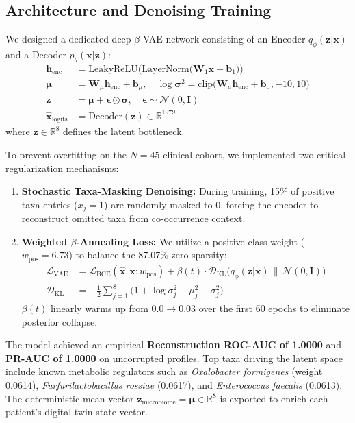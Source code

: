 \documentclass[conference]{IEEEtran}
\begin{document}
\subsection{Architecture and Denoising Training}
We designed a dedicated deep $\beta$-VAE network consisting of an Encoder $q_\phi(\mathbf{z}|\mathbf{x})$ and a Decoder $p_\theta(\mathbf{x}|\mathbf{z})$:
\begin{align}
    \mathbf{h}_{\text{enc}} &= \text{LeakyReLU}\Big(\text{LayerNorm}\big(\mathbf{W}_1 \mathbf{x} + \mathbf{b}_1\big)\Big) \\
    \boldsymbol{\mu} &= \mathbf{W}_\mu \mathbf{h}_{\text{enc}} + \mathbf{b}_\mu, \quad \log \boldsymbol{\sigma}^2 = \text{clip}\big(\mathbf{W}_\sigma \mathbf{h}_{\text{enc}} + \mathbf{b}_\sigma, -10, 10\big) \\
    \mathbf{z} &= \boldsymbol{\mu} + \boldsymbol{\epsilon} \odot \boldsymbol{\sigma}, \quad \boldsymbol{\epsilon} \sim \mathcal{N}(0, \mathbf{I}) \\
    \hat{\mathbf{x}}_{\text{logits}} &= \text{Decoder}(\mathbf{z}) \in \mathbb{R}^{1979}
\end{align}
where $\mathbf{z} \in \mathbb{R}^8$ defines the latent bottleneck.

To prevent overfitting on the $N=45$ clinical cohort, we implemented two critical regularization mechanisms:
\begin{enumerate}
    \item \textbf{Stochastic Taxa-Masking Denoising:} During training, 15\% of positive taxa entries ($x_j = 1$) are randomly masked to $0$, forcing the encoder to reconstruct omitted taxa from co-occurrence context.
    \item \textbf{Weighted $\beta$-Annealing Loss:} We utilize a positive class weight ($w_{\text{pos}} = 6.73$) to balance the 87.07\% zero sparsity:
    \begin{align}
        \mathcal{L}_{\text{VAE}} &= \mathcal{L}_{\text{BCE}}(\hat{\mathbf{x}}, \mathbf{x}; w_{\text{pos}}) + \beta(t) \cdot \mathcal{D}_{\text{KL}}\big(q_\phi(\mathbf{z}|\mathbf{x}) \,\|\, \mathcal{N}(0, \mathbf{I})\big) \\
        \mathcal{D}_{\text{KL}} &= -\frac{1}{2} \sum_{j=1}^{8} \Big(1 + \log \sigma_j^2 - \mu_j^2 - \sigma_j^2\Big)
    \end{align}
    $\beta(t)$ linearly warms up from $0.0 \rightarrow 0.03$ over the first 60 epochs to eliminate posterior collapse.
\end{enumerate}

The model achieved an empirical \textbf{Reconstruction ROC-AUC of 1.0000} and \textbf{PR-AUC of 1.0000} on uncorrupted profiles. Top taxa driving the latent space include known metabolic regulators such as \emph{Oxalobacter formigenes} (weight 0.0614), \emph{Furfurilactobacillus rossiae} (0.0617), and \emph{Enterococcus faecalis} (0.0613). The deterministic mean vector $\mathbf{z}_{\text{microbiome}} = \boldsymbol{\mu} \in \mathbb{R}^8$ is exported to enrich each patient's digital twin state vector.
\end{document}
